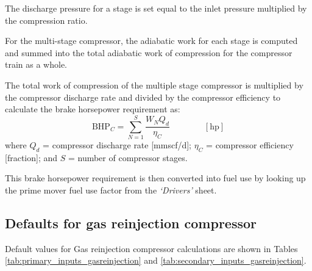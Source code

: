 \documentclass[11pt]{report}
\newcommand{\sheet}[1]{\textit{`{#1}'}}
\newcommand{\eqnunit}[1]{\quad\quad \scriptstyle{\left[\text{#1}\right]}}
\begin{document}
The discharge pressure for a stage is set equal to the inlet pressure multiplied by the compression ratio.

For the multi-stage compressor, the adiabatic work for each stage is computed and summed into the total adiabatic work of compression for the compressor train as a whole.

The total work of compression of the multiple stage compressor is multiplied by the compressor discharge rate and divided by the compressor efficiency to calculate the brake horsepower requirement as:
\begin{equation} \label{eq:compressor_BHP}
\text{BHP$_{C}$}= \sum_{N=1}^S \frac{{W_{N}} Q_{d}}{\eta_C} \quad\quad\eqnunit{hp}
\end{equation}
where $Q_{d}$ = compressor discharge rate [mmscf/d]; $\eta_C$ = compressor efficiency [fraction]; and $S$ = number of compressor stages.

This brake horsepower requirement is then converted into fuel use by looking up the prime mover fuel use factor from the \sheet{Drivers} sheet.

\subsection{Defaults for gas reinjection compressor}
Default values for Gas reinjection compressor calculations are shown in Tables \ref{tab:primary_inputs_gasreinjection} and \ref{tab:secondary_inputs_gasreinjection}.
\end{document}
